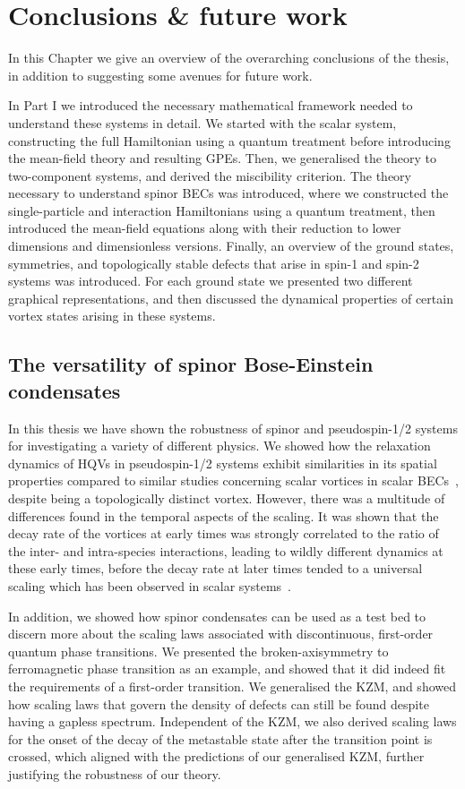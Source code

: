 \chapter{Conclusions \& future work}\label{chap: conclusions}
In this Chapter we give an overview of the overarching conclusions of the
thesis, in addition to suggesting some avenues for future work.

In Part I we introduced the necessary mathematical framework needed to
understand these systems in detail.
We started with the scalar system, constructing the full Hamiltonian using a
quantum treatment before introducing the mean-field theory and resulting GPEs.
Then, we generalised the theory to two-component systems, and derived the
miscibility criterion.
The theory necessary to understand spinor BECs was introduced, where we
constructed the single-particle and interaction Hamiltonians using a quantum
treatment, then introduced the mean-field equations along with their reduction
to lower dimensions and dimensionless versions.
Finally, an overview of the ground states, symmetries, and topologically stable
defects that arise in spin-1 and spin-2 systems was introduced.
For each ground state we presented two different graphical representations, and
then discussed the dynamical properties of certain vortex states arising in
these systems.

\section{The versatility of spinor Bose-Einstein condensates}
In this thesis we have shown the robustness of spinor and pseudospin-1/2 systems
for investigating a variety of different physics.
We showed how the relaxation dynamics of HQVs in pseudospin-1/2 systems exhibit
similarities in its spatial properties compared to similar studies concerning
scalar vortices in scalar BECs~\cite{Nowak2012,Karl2017}, despite being a
topologically distinct vortex.
However, there was a multitude of differences found in the temporal aspects of
the scaling.
It was shown that the decay rate of the vortices at early times was strongly
correlated to the ratio of the inter- and intra-species interactions, leading to
wildly different dynamics at these early times, before the decay rate at later
times tended to a universal scaling which has been observed in scalar
systems~\cite{Karl2017}.

In addition, we showed how spinor condensates can be used as a test bed to
discern more about the scaling laws associated with discontinuous, first-order
quantum phase transitions.
We presented the broken-axisymmetry to ferromagnetic phase transition as an
example, and showed that it did indeed fit the requirements of a first-order
transition.
We generalised the KZM, and showed how scaling laws that govern the density of
defects can still be found despite having a gapless spectrum.
Independent of the KZM, we also derived scaling laws for the onset of the decay
of the metastable state after the transition point is crossed, which aligned
with the predictions of our generalised KZM, further justifying the robustness
of our theory.

